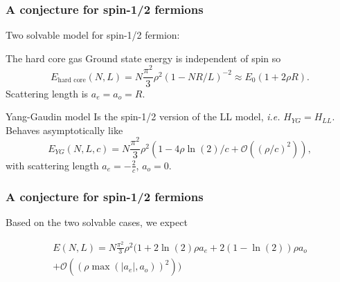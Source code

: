 \documentclass{beamer}[10]
\newcommand{\abs}[1]{\left\lvert #1 \right\rvert}
\newcommand{\ie}{\emph{i.e.} }
\begin{document}
\begin{frame}
	\frametitle{A conjecture for spin-1/2 fermions}
	Two solvable model for spin-1/2 fermion:
	\begin{block}{The hard core gas}
		Ground state energy is independent of spin
		so \begin{equation}
		E_{\text{hard core}}(N,L)=N\frac{\pi^2}{3}\rho^2 (1-NR/L)^{-2}\approx E_0(1+2\rho R).
		\end{equation}
		Scattering length is $ a_e=a_o=R $.
	\end{block}
	\begin{block}{Yang-Gaudin model}
		Is the spin-1/2 version of the LL model, \ie $ H_{YG}=H_{LL} $.
		 Behaves asymptotically like
		 \begin{equation}
		 E_{YG}(N,L,c)=N\frac{\pi^2}{3}\rho^2\left(1-4\rho\ln(2)/c+\mathcal{O}\left((\rho/c)^2\right)\right),
		 \end{equation}
		 with scattering length $ a_e=-\frac{2}{c} $, $ a_o=0 $.
		\end{block}
\end{frame}
\begin{frame}
	\frametitle{A conjecture for spin-1/2 fermions}
	Based on the two solvable cases, we expect \begin{block}
		\small\begin{equation}
		\begin{aligned}
		E(N,L)=N\frac{\pi^2}{3}\rho^2\Big(1+2\ln(2)\rho a_e+2(1-\ln(2))\rho a_o\\+\mathcal{O}\left((\rho\max(\abs{a_e},a_o))^2\right)\Big)
		\end{aligned}
		\end{equation}
	\end{block}
\end{frame}

\begin{frame}
\end{frame}
\end{document}
